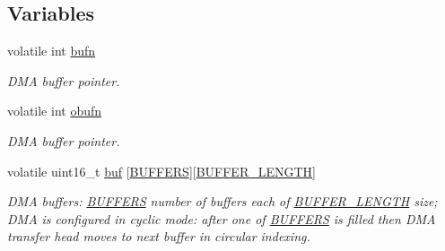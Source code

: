 \subsection*{Variables}
\begin{DoxyCompactItemize}
\item 
\mbox{\label{group___board__model__group_gad2658b77f345b15c03759c02d1ba0e81}} 
volatile int \mbox{\hyperlink{group___board__model__group_gad2658b77f345b15c03759c02d1ba0e81}{bufn}}
\begin{DoxyCompactList}\small\item\em D\+MA buffer pointer. \end{DoxyCompactList}\item 
\mbox{\label{group___board__model__group_gafef4d6ed48b3edc5f7a74defba82e7d8}} 
volatile int \mbox{\hyperlink{group___board__model__group_gafef4d6ed48b3edc5f7a74defba82e7d8}{obufn}}
\begin{DoxyCompactList}\small\item\em D\+MA buffer pointer. \end{DoxyCompactList}\item 
\mbox{\label{group___board__model__group_gaa785fe4a3446344207127079a33a9ea6}} 
volatile uint16\+\_\+t \mbox{\hyperlink{group___board__model__group_gaa785fe4a3446344207127079a33a9ea6}{buf}} \mbox{[}\mbox{\hyperlink{group___board__model__group_gaabe0f927d44a09f458bd5fe5ab4e2f7f}{B\+U\+F\+F\+E\+RS}}\mbox{]}\mbox{[}\mbox{\hyperlink{group___board__model__group_gaf7b7dc9a200cb1404c280bd500fd1551}{B\+U\+F\+F\+E\+R\+\_\+\+L\+E\+N\+G\+TH}}\mbox{]}
\begin{DoxyCompactList}\small\item\em D\+MA buffers\+: \mbox{\hyperlink{group___board__model__group_gaabe0f927d44a09f458bd5fe5ab4e2f7f}{B\+U\+F\+F\+E\+RS}} number of buffers each of \mbox{\hyperlink{group___board__model__group_gaf7b7dc9a200cb1404c280bd500fd1551}{B\+U\+F\+F\+E\+R\+\_\+\+L\+E\+N\+G\+TH}} size; D\+MA is configured in cyclic mode\+: after one of \mbox{\hyperlink{group___board__model__group_gaabe0f927d44a09f458bd5fe5ab4e2f7f}{B\+U\+F\+F\+E\+RS}} is filled then D\+MA transfer head moves to next buffer in circular indexing. \end{DoxyCompactList}\item 
\mbox{\label{group___board__model__group_ga3d6043851868b7da3c1d6381f835a559}} 

\end{DoxyCompactItemize}
